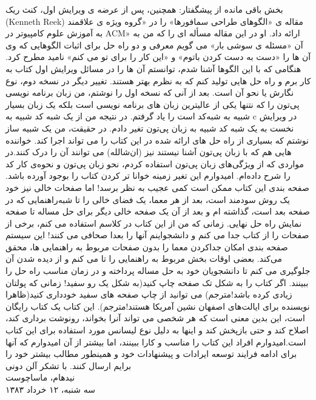 \documentclass{book}
\begin{document}
بخش باقی مانده از پیشگفتار:
همچنین، پس از عرضه ی ویرایش اول، کنث ریک (Kenneth Reek) مقاله ی «الگوهای طراحی سمافورها» را در «گروه ویژه ی علاقمند به آموزش علوم کامپیوتر در ACM» ارائه داد. او در این مقاله مسأله ای را که من به آن «مسئله ی سوشی بار» می گویم معرفی و دو راه حل برای اثبات الگوهایی که وی آن ها را «دست به دست کردن باتوم» و «این کار را برای تو می کنم» نامید مطرح کرد. هنگامی که با این الگوها آشنا شدم، توانستم آن ها را در مسائل ویرایش اول کتاب به کار برم و راه حل هایی تولید کنم که به نظرم بهتر هستند.
تغییر دیگر در نسخه دوم، نوع نگارش یا نحو آن است. بعد از آنی که نسخه اول را نوشتم، من زبان برنامه نویسی پی‌تون را که نتنها یکی از عالیترین زبان های برنامه نویسی است بلکه یک زبان بسیار شبیه به شبه‌کد است را یاد گرفتم. در نتیجه من از یک شبه کد شبیه به c در ویرایش نخست به یک شبه کد شبیه به زبان پی‌تون تغیر دادم. در حقیقت، من یک شبیه ساز نوشتم که بسیاری از راه حل های ارائه شده در این کتاب را می تواند اجرا کند. خواننده هایی هم که با زبان پی‌تون آشنا نیستند نیز (ان‌شالله) می توانند آن را درک کنند.در مواردی که از ویژگی‌های زبان پی‌تون استفاده کردم، نحو زبان پی‌تون و نحوه‌ی کار کد را شرح داده‌ام. امیدوارم این تغیر زمینه خوانا تر کردن کتاب را بوجود آورده باشد. صفحه بندی این کتاب ممکن است کمی عجیب به نظر برسد! اما صفحات خالی نیز خود یک روش سودمند است، بعد از هر معما، یک فضای خالی را تا شبه‌راهنمایی که در صفحه بعد است، گذاشته ام و بعد از آن یک صفحه خالی دیگر برای حل مساله تا صفحه نمایش راه حل نهایی. زمانی که من از این کتاب در کلاسم استفاده می کنم، برخی از صفحات را از کتاب جدا می کنم و دانشجواینم آنها را بعدا صحافی می کنند! این سیستم صفحه بندی امکان جداکردن معما را بدون صفحات مربوط به راهنمایی ها، محقق می‌کند. بعضی اوقات بخش مربوط به راهنمایی را تا می کنم و از دیده شدن آن جلوگیری می کنم تا دانشجویان خود به حل مساله پرداخته و در زمان مناسب راه حل را ببینند. اگر کتاب را به شکل تک صفحه چاپ کنید(به شکل یک رو سفید! زمانی که پولتان زیادی کرده باشد!مترجم) می توانید از چاپ صفحه های سفید خودداری کنید(ظاهرا نویسنده برای ایالت‌های اصفهان نشین آمریکا هستند!مترجم). 
این کتاب یک کتاب رایگان است، این بدین معنی است که هر شخصی می تواند آنرا بخواند، رونوشت برداری کند، اصلاح کند و حتی بازپخش کند و اینها به دلیل نوع لیسانس مورد استفاده برای این کتاب است.امیدوارم افراد این کتاب را مناسب و کارا ببینند، اما بیشتر از آن امیدوارم که آنها برای ادامه فرایند توسعه ایرادات و پیشنهادات خود و همینطور مطالب بیشتر خود را برایم ارسال کنند.
با تشکر
\vspace{0.3in}
\noindent آلن دونی \\
\noindent نیدهام، ماساچوست \\
\noindent سه شنبه، ۱۲ خرداد ۱۳۸۳\\
\end{document}

